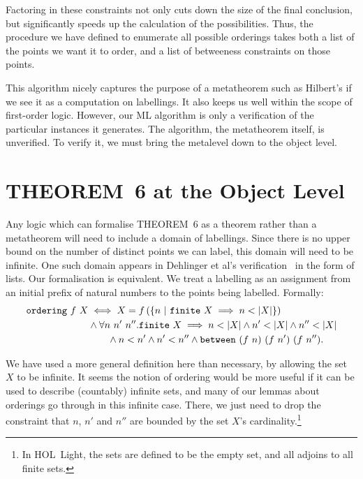 Factoring in these constraints not only cuts down the size of the final conclusion, but significantly speeds up the calculation of the possibilities. Thus, the procedure we have defined to enumerate all possible orderings takes both a list of the points we want it to order, and a list of betweeness constraints on those points. 

This algorithm nicely captures the purpose of a metatheorem such as Hilbert's if we see it as a computation on labellings. It also keeps us well within the scope of first-order logic. However, our ML algorithm is only a verification of the particular instances it generates. The algorithm, the metatheorem itself, is unverified. To verify it, we must bring the metalevel down to the object level.

\section{THEOREM~6 at the Object Level}
Any logic which can formalise THEOREM~6 as a theorem rather than a metatheorem will need to include a domain of labellings. Since there is no upper bound on the number of distinct points we can label, this domain will need to be infinite. One such domain appears in Dehlinger et al's verification~\cite{DehlingerFOG} in the form of lists. Our formalisation is equivalent. We treat a labelling as an assignment from an initial prefix of natural numbers to the points being labelled. Formally:
\label{sec:OrderingDef}
\begin{equation}\label{eq:OrderingDef}
  \begin{split}
    \code{ordering}\ f\ X &\iff X = f\left(\left\{n\ \vert\ \code{finite}\ X \implies n < \left|X\right|\right\}\right)\\
    &\wedge \forall n\ n'\ n''. \code{finite}\ X \implies n < \left|X\right| \wedge n' < \left|X\right| \wedge n'' < \left|X\right|\\
    &\qquad\wedge n < n' \wedge n' < n'' \wedge \between{(f\ n)}{(f\ n')}{(f\ n'')}.
    \end{split}
\end{equation}

We have used a more general definition here than necessary, by allowing the set $X$ to be infinite. It seems the notion of ordering would be more useful if it can be used to describe (countably) infinite sets, and many of our lemmas about orderings go through in this infinite case. There, we just need to drop the constraint that $n$, $n'$ and $n''$ are bounded by the set $X$'s cardinality.\footnote{In HOL~Light, the  sets are defined to be the empty set, and all adjoins to all finite sets.} 

